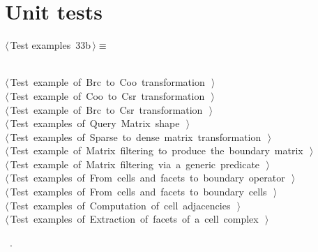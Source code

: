 \documentclass[11pt,oneside]{article}	%
\begin{document}
\section{Unit tests}


\begin{flushleft} \small \label{scrap57}
\protect{}$\langle\,$Test examples\nobreak\ {\footnotesize 33b}$\,\rangle\equiv$
\vspace{-1ex}
\begin{list}{}{} \item
\mbox{}\verb@@\\
\mbox{}\verb@@\hbox{$\langle\,$Test example of Brc to Coo transformation\nobreak\ {\footnotesize {}}$\,\rangle$}\verb@@\\
\mbox{}\verb@@\hbox{$\langle\,$Test example of Coo to Csr transformation\nobreak\ {\footnotesize {}}$\,\rangle$}\verb@@\\
\mbox{}\verb@@\hbox{$\langle\,$Test example of Brc to Csr transformation\nobreak\ {\footnotesize {}}$\,\rangle$}\verb@@\\
\mbox{}\verb@@\hbox{$\langle\,$Test examples of Query Matrix shape\nobreak\ {\footnotesize {}}$\,\rangle$}\verb@@\\
\mbox{}\verb@@\hbox{$\langle\,$Test examples of Sparse to dense matrix transformation\nobreak\ {\footnotesize {}}$\,\rangle$}\verb@@\\
\mbox{}\verb@@\hbox{$\langle\,$Test example of Matrix filtering to produce the boundary matrix\nobreak\ {\footnotesize {}}$\,\rangle$}\verb@@\\
\mbox{}\verb@@\hbox{$\langle\,$Test example of Matrix filtering via a generic predicate\nobreak\ {\footnotesize {}}$\,\rangle$}\verb@@\\
\mbox{}\verb@@\hbox{$\langle\,$Test examples of From cells and facets to boundary operator\nobreak\ {\footnotesize {}}$\,\rangle$}\verb@@\\
\mbox{}\verb@@\hbox{$\langle\,$Test examples of From cells and facets to boundary cells\nobreak\ {\footnotesize {}}$\,\rangle$}\verb@@\\
\mbox{}\verb@@\hbox{$\langle\,$Test examples of Computation of cell adjacencies\nobreak\ {\footnotesize {}}$\,\rangle$}\verb@@\\
\mbox{}\verb@@\hbox{$\langle\,$Test examples of Extraction of facets of a cell complex\nobreak\ {\footnotesize {}}$\,\rangle$}\verb@@\\
\mbox{}\verb@@{\NWsep}
\end{list}
\vspace{-1ex}
\footnotesize\addtolength{\baselineskip}{-1ex}
\begin{list}{}{\setlength{\itemsep}{-\parsep}\setlength{\itemindent}{-\leftmargin}}
\item \NWtxtMacroRefIn\ .
\end{list}
\end{flushleft}
\end{document}
